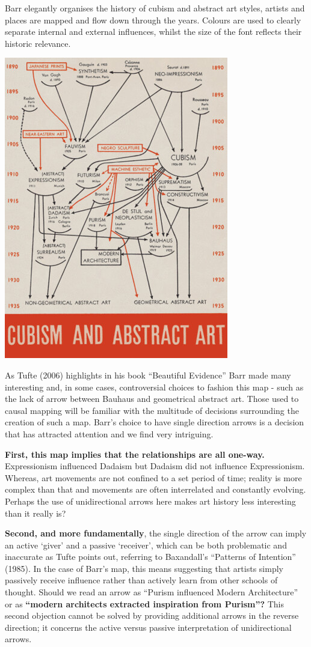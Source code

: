 \documentclass[
]{book}
\begin{document}
Barr elegantly organises the history of cubism and abstract art styles, artists and places are mapped and flow down through the years. Colours are used to clearly separate internal and external influences, whilst the size of the font reflects their historic relevance.

\includegraphics{_assets/TufteOG-16335945994571.jpg}

As Tufte (2006) highlights in his book ``Beautiful Evidence'' Barr made many interesting and, in some cases, controversial choices to fashion this map - such as the lack of arrow between Bauhaus and geometrical abstract art. Those used to causal mapping will be familiar with the multitude of decisions surrounding the creation of such a map. Barr's choice to have single direction arrows is a decision that has attracted attention and we find very intriguing.

\textbf{First, this map implies that the relationships are all one-way.} Expressionism influenced Dadaism but Dadaism did not influence Expressionism. Whereas, art movements are not confined to a set period of time; reality is more complex than that and movements are often interrelated and constantly evolving. Perhaps the use of unidirectional arrows here makes art history less interesting than it really is?

\textbf{Second, and more fundamentally}, the single direction of the arrow can imply an active `giver' and a passive `receiver', which can be both problematic and inaccurate as Tufte points out, referring to Baxandall's ``Patterns of Intention'' (1985). In the case of Barr's map, this means suggesting that artists simply passively receive influence rather than actively learn from other schools of thought. Should we read an arrow as ``Purism influenced Modern Architecture'' or as \textbf{``modern architects extracted inspiration from Purism''?} This second objection cannot be solved by providing additional arrows in the reverse direction; it concerns the active versus passive interpretation of unidirectional arrows.
\end{document}
